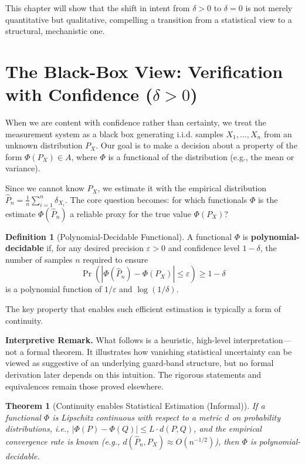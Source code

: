 \documentclass[12pt]{article}
\theoremstyle{definition}
\newtheorem{definition}{Definition}[section]
\theoremstyle{plain}
\newtheorem{theorem}{Theorem}[section]
\begin{document}
This chapter will show that the shift in intent from $\delta > 0$ to $\delta = 0$ is not merely quantitative but qualitative, compelling a transition from a statistical view to a structural, mechanistic one.

\section{The Black-Box View: Verification with Confidence ($\delta > 0$)}

When we are content with confidence rather than certainty, we treat the measurement system as a black box generating i.i.d. samples $X_1, \dots, X_n$ from an unknown distribution $P_X$. Our goal is to make a decision about a property of the form $\Phi(P_X) \in A$, where $\Phi$ is a functional of the distribution (e.g., the mean or variance).

Since we cannot know $P_X$, we estimate it with the empirical distribution $\widehat{P}_n = \frac{1}{n}\sum_{i=1}^n \delta_{X_i}$. The core question becomes: for which functionals $\Phi$ is the estimate $\Phi(\widehat{P}_n)$ a reliable proxy for the true value $\Phi(P_X)$?

\begin{definition}[Polynomial-Decidable Functional]
A functional $\Phi$ is \textbf{polynomial-decidable} if, for any desired precision $\varepsilon > 0$ and confidence level $1-\delta$, the number of samples $n$ required to ensure
\[
\Pr\left( |\Phi(\widehat{P}_n) - \Phi(P_X)| \le \varepsilon \right) \ge 1-\delta
\]
is a polynomial function of $1/\varepsilon$ and $\log(1/\delta)$.
\end{definition}

The key property that enables such efficient estimation is typically a form of continuity.

\textbf{Interpretive Remark.} What follows is a heuristic, high-level interpretation—not a formal theorem. It illustrates how vanishing statistical uncertainty can be viewed as suggestive of an underlying guard-band structure, but no formal derivation later depends on this intuition. The rigorous statements and equivalences remain those proved elsewhere.


\begin{theorem}[Continuity enables Statistical Estimation (Informal)]
If a functional $\Phi$ is Lipschitz continuous with respect to a metric $d$ on probability distributions, i.e., $|\Phi(P) - \Phi(Q)| \le L \cdot d(P, Q)$, and the empirical convergence rate is known (e.g., $d(\widehat{P}_n, P_X) \approx O(n^{-1/2})$), then $\Phi$ is polynomial-decidable.
\end{theorem}
\end{document}
